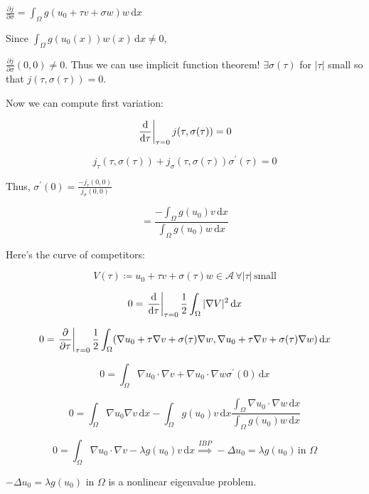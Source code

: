 \documentclass{article}
\theoremstyle{definition}
\begin{document}
\begin{enumerate}[label=\arabic*)]
    \(\frac{\partial j}{\partial \sigma} = \int_{\Omega} g(u_0 + \tau v + \sigma w) w \,\mathrm{d}x  \) 

    Since \(\int_{\Omega} g(u_0(x))w(x) \,\mathrm{d}x \neq 0\),

    \(\frac{\partial j}{\partial \sigma} (0,0) \neq 0\). Thus we can use implicit function theorem! \(\exists \sigma(\tau)\) for \(\vert \tau \vert\) small so that \(j(\tau , \sigma(\tau)) = 0\).

    Now we can compute first variation:

    \[
        \eval{\frac{\mathrm{d}}{\mathrm{d}\tau}}_{\tau = 0} j(\tau, \sigma(\tau)) = 0
    \]

    \[
        j_{\tau} (\tau, \sigma(\tau)) + j_\sigma (\tau, \sigma(\tau)) \sigma^{\prime}(\tau) = 0
    \]

    Thus, \(\sigma ^{\prime} (0) = \frac{- j_{\tau}(0,0)}{j_\sigma(0,0)}\) 

    \[
        = \frac{- \int_{\Omega} g(u_0) v \,\mathrm{d}x}{\int_{\Omega} g(u_0) w \,\mathrm{d}x}
    \]

    Here's the curve of competitors:

    \[
        V(\tau) \coloneqq u_0 + \tau v + \sigma (\tau) w \in \mathcal{A} \, \forall \vert \tau \vert \, \text{small}
    \]

    \[
        0 = \eval{\frac{\mathrm{d}}{\mathrm{d}\tau}}_{\tau = 0} \frac{1}{2} \int_{\Omega} \vert \nabla V \vert ^ 2 \,\mathrm{d}x 
    \]

    \[
        0 = \eval{\frac{\partial}{\partial \tau}}_{\tau = 0} \frac{1}{2} \int_{\Omega} (\nabla u_0 + \tau \nabla v + \sigma (\tau) \nabla w, \nabla u_0 + \tau \nabla v + \sigma (\tau) \nabla w) \,\mathrm{d}x 
    \]

    \[
        0 = \int_{\Omega} \nabla u_0 \cdot \nabla v + \nabla u_0 \cdot \nabla w \sigma ^{\prime} (0) \,\mathrm{d}x 
    \]

    \[
        0 = \int_{\Omega} \nabla u_0 \nabla v \,\mathrm{d}x - \int_{\Omega} g(u_0) v \,\mathrm{d}x \frac{\int_{\Omega} \nabla u_0 \cdot \nabla w \,\mathrm{d}x }{\int_{\Omega} g(u_0) w \,\mathrm{d}x }
    \]

    \[
        0 = \int_{\Omega} \nabla u_0 \cdot \nabla v - \lambda g(u_0) v \,\mathrm{d}x \overset{IBP}{\implies} - \Delta u_0 = \lambda g(u_0) \, \text{in } \Omega 
    \]

    \(- \Delta u_0 = \lambda g(u_0)\) in \(\Omega\) is a nonlinear eigenvalue problem.

\end{enumerate} 
\end{document}
